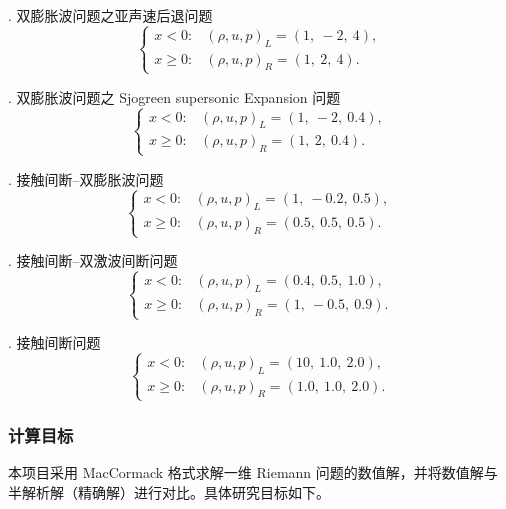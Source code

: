 . 双膨胀波问题之亚声速后退问题
\begin{equation}
\begin{cases}
x<0: & (\rho,u,p)_L=(1,\ -2,\ 4),\\
x\geq 0: & (\rho,u,p)_R=(1,\ 2,\ 4).
\end{cases}
\end{equation}

. 双膨胀波问题之 Sjogreen supersonic Expansion 问题
\begin{equation}
\begin{cases}
x<0: & (\rho,u,p)_L=(1,\ -2,\ 0.4),\\
x\geq 0: & (\rho,u,p)_R=(1,\ 2,\ 0.4).
\end{cases}
\end{equation}

. 接触间断--双膨胀波问题
\begin{equation}
\begin{cases}
x<0: & (\rho,u,p)_L=(1,\ -0.2,\ 0.5),\\
x\geq 0: & (\rho,u,p)_R=(0.5,\ 0.5,\ 0.5).
\end{cases}
\end{equation}

. 接触间断--双激波间断问题
\begin{equation}
\begin{cases}
x<0: & (\rho,u,p)_L=(0.4,\ 0.5,\ 1.0),\\
x\geq 0: & (\rho,u,p)_R=(1,\ -0.5,\ 0.9).
\end{cases}
\end{equation}

. 接触间断问题
\begin{equation}
\begin{cases}
x<0: & (\rho,u,p)_L=(10,\ 1.0,\ 2.0),\\
x\geq 0: & (\rho,u,p)_R=(1.0,\ 1.0,\ 2.0).
\end{cases}
\end{equation}

\subsubsection{计算目标}

本项目采用 MacCormack 格式求解一维 Riemann 问题的数值解，并将数值解与
半解析解（精确解）进行对比。具体研究目标如下。

